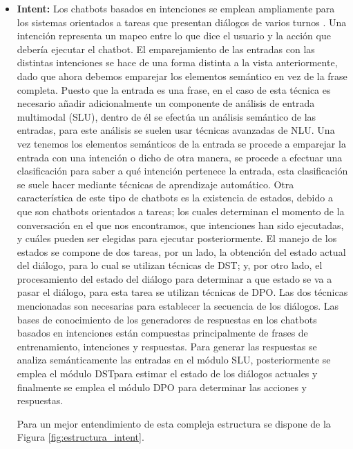 \begin{itemize}
\item \textbf{Intent:} Los chatbots basados en intenciones se emplean ampliamente para los sistemas orientados a tareas que presentan diálogos de varios turnos \cite{RefWorks:RefID:36-luo2022critical}. Una intención representa un mapeo entre lo que dice el usuario y la acción que debería ejecutar el chatbot. El emparejamiento de las entradas con las distintas intenciones se hace de una forma distinta a la vista anteriormente, dado que ahora debemos emparejar los elementos semántico en vez de la frase completa. Puesto que la entrada es una frase, en el caso de esta técnica es necesario añadir adicionalmente un componente de análisis de entrada multimodal (SLU), dentro de él se efectúa un análisis semántico de las entradas, para este análisis se suelen usar técnicas avanzadas de \gls{NLU}. Una vez tenemos los elementos semánticos de la entrada se procede a emparejar la entrada con una intención o dicho de otra manera, se procede a efectuar una clasificación para saber a qué intención pertenece la entrada, esta clasificación se suele hacer mediante técnicas de aprendizaje automático. Otra característica de este tipo de chatbots es la existencia de estados, debido a que son chatbots orientados a tareas; los cuales determinan el momento de la conversación en el que nos encontramos, que intenciones han sido ejecutadas, y cuáles pueden ser elegidas para ejecutar posteriormente. El manejo de los estados se compone de dos tareas, por un lado, la obtención del estado actual del diálogo, para lo cual se utilizan técnicas de \gls{DST}; y, por otro lado, el procesamiento del estado del diálogo para determinar a que estado se va a pasar el diálogo, para esta tarea se utilizan técnicas de \gls{DPO}. Las dos técnicas mencionadas son necesarias para establecer la secuencia de los diálogos. Las bases de conocimiento de los generadores de respuestas en los chatbots basados en intenciones están compuestas principalmente de frases de entrenamiento, intenciones y respuestas. Para generar las respuestas se analiza semánticamente las entradas en el módulo SLU, posteriormente se emplea el módulo \gls{DST}para estimar el estado de los diálogos actuales y finalmente se emplea el módulo \gls{DPO} para determinar las acciones y respuestas.

Para un mejor entendimiento de esta compleja estructura se dispone de la Figura \ref{fig:estructura_intent}.


\end{itemize}
